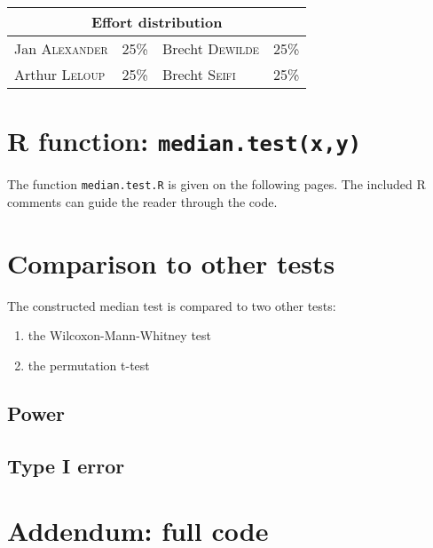 \documentclass[12pt,letterpaper]{article}
\begin{document}
\begin{table}[h!]
\begin{tabular}{ lc|lc } 
\multicolumn{4}{c}{Effort distribution}\\
 \hline
 Jan \textsc{Alexander} & 25\% & Brecht \textsc{Dewilde} & 25\%\\ 
Arthur \textsc{Leloup} & 25\% & Brecht \textsc{Seifi} & 25\% \\ 
 \hline
\end{tabular}
\end{table}



\section{R function: \texttt{median.test(x,y)}}
The function \texttt{median.test.R} is given on the following pages.
The included R comments can guide the reader through the code.


        

\section{Comparison to other tests}

The constructed median test is compared to two other tests:
\begin{enumerate}
	\item the Wilcoxon-Mann-Whitney test
	\item the permutation t-test
\end{enumerate}

\subsection{Power}



\subsection{Type I error}

\newpage  
\section*{Addendum: full code}

\end{document}
